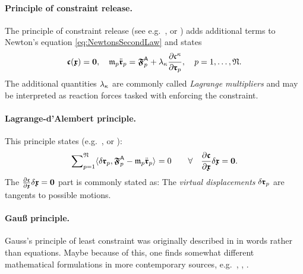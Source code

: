 \paragraph{Principle of constraint release.} 
The principle of constraint release (see e.g.\ \cite[sec.\ III.5]{Lanczos:Variational}, \cite[sec.\ 32]{Hamel:TheoretischeMechanik} or \cite[sec.\ 6.1]{Lurie:AnalyticalMechanics}) adds additional terms to Newton's equation \eqref{eq:NewtonsSecondLaw} and states
\begin{align}\label{eq:ConstraintRelease}
 \particleGeoConstraint(\particleCoord) = \tuple{0},
\quad
 \particleMass{\PidxI} \particlePosdd{\PidxI} = \particleForceImpressed{\PidxI} + \LagrangeMultCoeff{\CidxI} \pdiff[\particleGeoConstraintCoeff{\CidxI}]{\particlePos{\PidxI}},
\quad \PidxI = 1,\ldots,\numParticles.
\end{align}
The additional quantities $\LagrangeMultCoeff{\CidxI}$ are commonly called \textit{Lagrange multipliers} and may be interpreted as reaction forces tasked with enforcing the constraint.

\paragraph{Lagrange-d'Alembert principle.} 
This principle states (e.g.\ \cite[sec.\ IV.2]{Lanczos:Variational}, \cite[sec.\,1.4]{Goldstein:ClassicalMechanics} or \cite[sec.\,6.3]{Lurie:AnalyticalMechanics}):
\begin{align}\label{eq:DAlembertPrinciple}
 \sumParticlesFull \sProd{\delta \particlePos{\PidxI}}{\particleForceImpressed{\PidxI} - \particleMass{\PidxI}\particlePosdd{\PidxI}} = 0 
\qquad \forall \quad \pdiff[\particleGeoConstraint]{\particleCoord} \delta\particleCoord = \tuple{0}.
\end{align}
The $\pdiff[\particleGeoConstraint]{\particleCoord} \delta\particleCoord = \tuple{0}$ part is commonly stated as: The \textit{virtual displacements} $\delta \particlePos{\PidxI}$ are tangents to possible motions.

\paragraph{Gauß principle.}
Gauss's principle of least constraint was originally described in \cite{Gauss:Principle} in words rather than equations.
Maybe because of this, one finds somewhat different mathematical formulations in more contemporary sources, e.g.\ \cite[sec.\ 7]{Paesler:PrinzipeDerMechanik}, \cite[sec.\ IV.8]{Lanczos:Variational}, \cite[sec.\,2.2]{Bremer:ElasticMultibodyDynamics}. %

